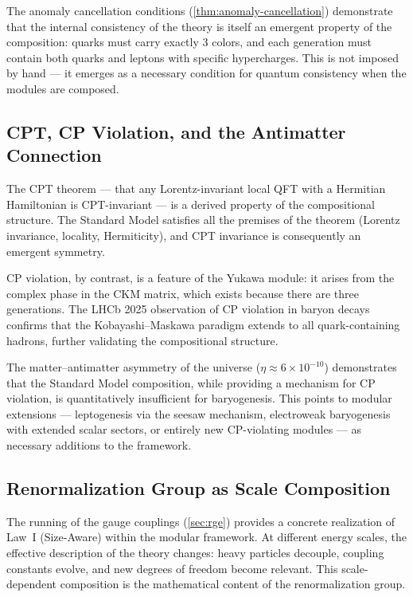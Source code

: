 \documentclass[12pt]{article}
\theoremstyle{definition}
\theoremstyle{remark}
\begin{document}
The anomaly cancellation conditions (\cref{thm:anomaly-cancellation}) demonstrate that the internal consistency of the theory is itself an emergent property of the composition: quarks must carry exactly 3 colors, and each generation must contain both quarks and leptons with specific hypercharges. This is not imposed by hand --- it emerges as a necessary condition for quantum consistency when the modules are composed.

\subsection{CPT, CP Violation, and the Antimatter Connection}

The CPT theorem --- that any Lorentz-invariant local QFT with a Hermitian Hamiltonian is CPT-invariant --- is a derived property of the compositional structure. The Standard Model satisfies all the premises of the theorem (Lorentz invariance, locality, Hermiticity), and CPT invariance is consequently an emergent symmetry.

CP violation, by contrast, is a feature of the Yukawa module: it arises from the complex phase in the CKM matrix, which exists because there are three generations. The LHCb 2025 observation of CP violation in baryon decays confirms that the Kobayashi--Maskawa paradigm extends to all quark-containing hadrons, further validating the compositional structure.

The matter--antimatter asymmetry of the universe ($\eta \approx 6 \times 10^{-10}$) demonstrates that the Standard Model composition, while providing a mechanism for CP violation, is quantitatively insufficient for baryogenesis. This points to modular extensions --- leptogenesis via the seesaw mechanism, electroweak baryogenesis with extended scalar sectors, or entirely new CP-violating modules --- as necessary additions to the framework.

\subsection{Renormalization Group as Scale Composition}

The running of the gauge couplings (\cref{sec:rge}) provides a concrete realization of Law~I (Size-Aware) within the modular framework. At different energy scales, the effective description of the theory changes: heavy particles decouple, coupling constants evolve, and new degrees of freedom become relevant. This scale-dependent composition is the mathematical content of the renormalization group.
\end{document}

